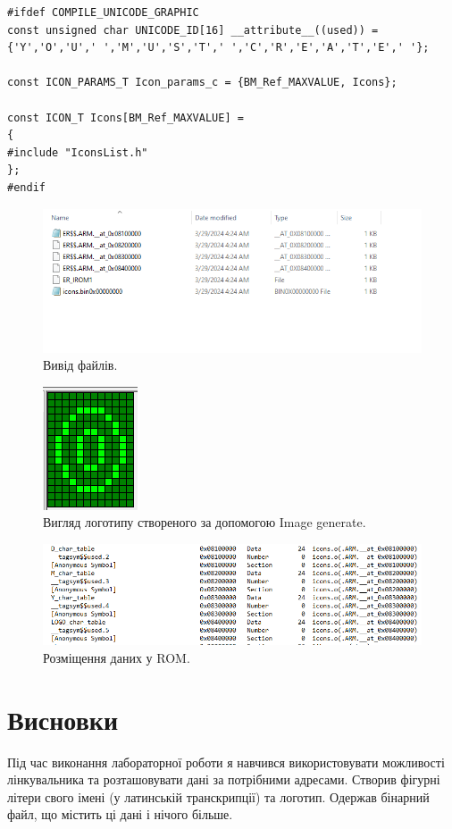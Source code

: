 \documentclass[oneside,14pt]{extarticle}
\begin{document}
\begin{normalsize}
{\begin{lstlisting}
#ifdef COMPILE_UNICODE_GRAPHIC
const unsigned char UNICODE_ID[16] __attribute__((used)) = {'Y','O','U',' ','M','U','S','T',' ','C','R','E','A','T','E',' '}; 

const ICON_PARAMS_T Icon_params_c = {BM_Ref_MAXVALUE, Icons};

const ICON_T Icons[BM_Ref_MAXVALUE] =
{
#include "IconsList.h"
};
#endif
		\end{lstlisting}
	}
	
	\begin{figure}[H]
	    \centering
	    \includegraphics[scale=0.7]{1}
	    \caption{Вивід файлів.}
	\end{figure}
	\begin{figure}[H]
	    \centering
	    \includegraphics[scale=0.7]{2}
	    \caption{Вигляд логотипу створеного за допомогою Image generate.}
	\end{figure}
	\begin{figure}[H]
	    \centering
	    \includegraphics[scale=0.5]{3}
	    \caption{Розміщення даних у ROM.}
	\end{figure}
	
	\section*{Висновки}
	Під час виконання лабораторної роботи я навчився використовувати можливості лінкувальника та розташовувати дані за потрібними адресами. Створив фігурні літери свого імені (у латинській транскрипції) та логотип. Одержав бінарний файл, що містить ці дані і нічого більше.
	    
\end{normalsize}
\end{document}
